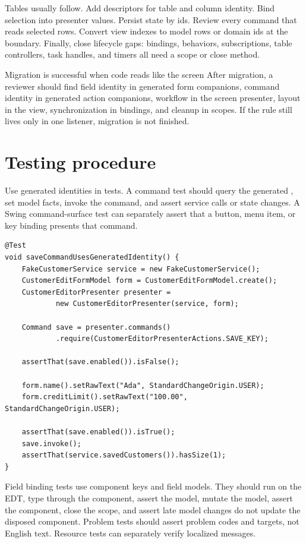 Tables usually follow. Add descriptors for table and column identity. Bind selection into presenter values. Persist state by ids. Review every command that reads selected rows. Convert view indexes to model rows or domain ids at the boundary. Finally, close lifecycle gaps: bindings, behaviors, subscriptions, table controllers, task handles, and timers all need a scope or close method.

\begin{principlebox}{Migration is successful when code reads like the screen}
After migration, a reviewer should find field identity in generated form companions, command identity in generated action companions, workflow in the screen presenter, layout in the view, synchronization in bindings, and cleanup in scopes. If the rule still lives only in one listener, migration is not finished.
\end{principlebox}

\section{Testing procedure}

Use generated identities in tests. A command test should query the generated , set model facts, invoke the command, and assert service calls or state changes. A Swing command-surface test can separately assert that a button, menu item, or key binding presents that command.

\begin{lstlisting}[caption={Command tests use generated action identity.}]
@Test
void saveCommandUsesGeneratedIdentity() {
    FakeCustomerService service = new FakeCustomerService();
    CustomerEditFormModel form = CustomerEditFormModel.create();
    CustomerEditorPresenter presenter =
            new CustomerEditorPresenter(service, form);

    Command save = presenter.commands()
            .require(CustomerEditorPresenterActions.SAVE_KEY);

    assertThat(save.enabled()).isFalse();

    form.name().setRawText("Ada", StandardChangeOrigin.USER);
    form.creditLimit().setRawText("100.00", StandardChangeOrigin.USER);

    assertThat(save.enabled()).isTrue();
    save.invoke();
    assertThat(service.savedCustomers()).hasSize(1);
}
\end{lstlisting}

Field binding tests use component keys and field models. They should run on the EDT, type through the component, assert the model, mutate the model, assert the component, close the scope, and assert late model changes do not update the disposed component. Problem tests should assert problem codes and targets, not English text. Resource tests can separately verify localized messages.

